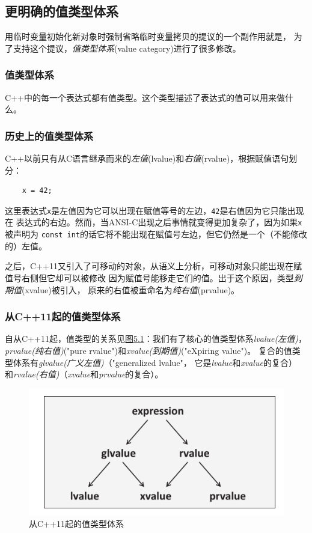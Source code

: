 \subsection{更明确的值类型体系}
用临时变量初始化新对象时强制省略临时变量拷贝的提议的一个副作用就是，
为了支持这个提议，\emph{值类型体系}(value category)进行了很多修改。

\subsubsection{值类型体系}\label{ch5.3.1}
C++中的每一个表达式都有值类型。这个类型描述了表达式的值可以用来做什么。

\subsubsection*{历史上的值类型体系}
C++以前只有从C语言继承而来的\emph{左值}(lvalue)和\emph{右值}(rvalue)，根据赋值语句划分：
\begin{lstlisting}
    x = 42;
\end{lstlisting}
这里表达式\texttt{x}是左值因为它可以出现在赋值等号的左边，\texttt{42}是右值因为它只能出现在
表达式的右边。然而，当ANSI-C出现之后事情就变得更加复杂了，因为如果\texttt{x}被声明为
\texttt{const int}的话它将不能出现在赋值号左边，但它仍然是一个（不能修改的）左值。

之后，C++11又引入了可移动的对象，从语义上分析，可移动对象只能出现在赋值号右侧但它却可以被修改
因为赋值号能移走它们的值。出于这个原因，类型\emph{到期值}(xvalue)被引入，
原来的右值被重命名为\emph{纯右值}(prvalue)。

\subsubsection*{从C++11起的值类型体系}
自从C++11起，值类型的关系见\hyperref[f5.1]{图5.1}：我们有了核心的值类型体系\emph{lvalue(左值)}，
\emph{prvalue(纯右值)}("pure rvalue")和\emph{xvalue(到期值)}("eXpiring value")。
复合的值类型体系有\emph{glvalue(广义左值)}（"generalized lvalue"，
它是\emph{lvalue}和\emph{xvalue}的复合）
和\emph{rvalue(右值)}（\emph{xvalue}和\emph{prvalue}的复合）。

\begin{figure}[ht]
    \begin{center}
        \includegraphics[scale=0.8]{../imgs/05.1.png}
        \caption{从C++11起的值类型体系}
        \label{f5.1}
    \end{center}
\end{figure}

